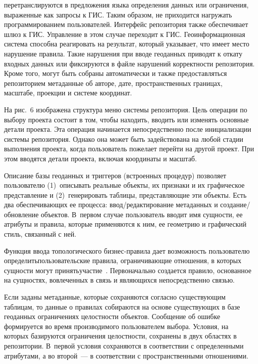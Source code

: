 \begin{multicols}{2}

\noindent
 перетранслируются в предложения языка определения 
данных или ограничения, выраженные как запросы к ГИС. Таким образом, не приходится 
нагружать программированием пользователей. Интерфейс репозитория также обеспечивает 
шлюз к ГИС. Управление в этом случае переходит к ГИС. Геоинформационная система 
способна реагировать на 
результат, который указывает, что имеет место нарушение правила. Такие нарушения при 
вводе геоданных приводят к откату входных данных или фиксируются в файле нарушений 
коррект\-ности репозитория. Кроме того, могут быть собраны автоматически и также 
предоставляться репозиторием метаданные об авторе, дате, пространственных границах, 
масштабе, проекции и системе коор\-динат.
{

}
      
      На рис.~6 изображена структура меню системы репозитория. Цель операции по 
выбору проекта состоит в том, чтобы находить, вводить или изменять основные детали 
проекта. Эта операция начинается непосредственно после инициализации системы 
репозитория. Однако она может быть задействована на любой стадии выполнения проекта, 
когда пользователь пожелает перейти на другой проект. При этом вводятся детали проекта, 
включая координаты и масштаб.



      Описание базы геоданных и триггеров (встроенных процедур) позволяет 
пользователю (1)~описывать реальные объекты, их признаки и их графическое 
представление и (2)~генерировать таб\-ли\-цы, представляющие эти объекты. Есть два 
обеспечивающих ее процесса: ввод/редактирование метаданных и создание/обновление 
объектов. В~первом случае пользователь вводит имя сущности, ее атрибуты и правила, 
которые применяются к ним, ее геометрию и графический стиль, связанный с ней. 
{

}
      
      Функция ввода топологического бизнес-пра\-ви\-ла дает возможность пользователю 
определить\linebreak пользовательские правила, ограничивающие от\-ношения, в которых сущности 
могут принять\linebreak учас\-тие~\cite{8dul}. Первоначально создается правило, основанное на 
сущностях, вовлеченных в связь и являющихся непосредственно связью. 
      
      Если заданы метаданные, которые сохраняются согласно существующим таблицам, 
то данные о правилах собираются на основе существующих в базе геоданных ограничениях 
целостности объектов. Сообщение об ошибке формируется во время производимого 
пользователем выбора. Условия, на которых базируются ограничения целостности, 
сохранены в двух областях в репозитории. В~первой условия сохраняются в соответствии с 
определенными атрибутами, а во второй~--- в соответствии с пространственными 
отношениями. 
      

\end{multicols}
